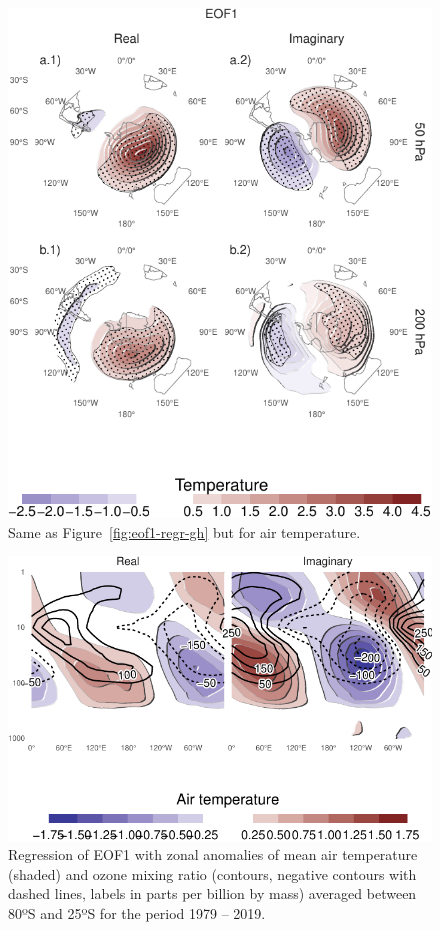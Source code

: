 \documentclass[smallextended]{svjour3}       %
\begin{document}
\begin{figure}
\centering
\includegraphics{../figures/eof1-regr-t-1.pdf}
\caption{\label{fig:eof1-regr-t}Same as Figure~\ref{fig:eof1-regr-gh} but for air temperature.}
\end{figure}



\begin{figure}
\centering
\includegraphics{../figures/t-vertical-1.pdf}
\caption{\label{fig:t-vertical}Regression of EOF1 with zonal anomalies of mean air temperature (shaded) and ozone mixing ratio (contours, negative contours with dashed lines, labels in parts per billion by mass) averaged between 80ºS and 25ºS for the period 1979 -- 2019.}
\end{figure}
\end{document}
